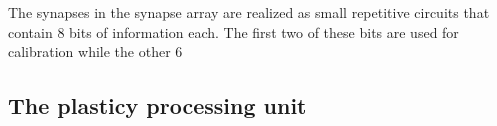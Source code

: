 The synapses in the synapse array are realized as small repetitive circuits that contain 8 bits of information each.
The first two of these bits are used for calibration while the other 6 

\subsection{The plasticy processing unit}

